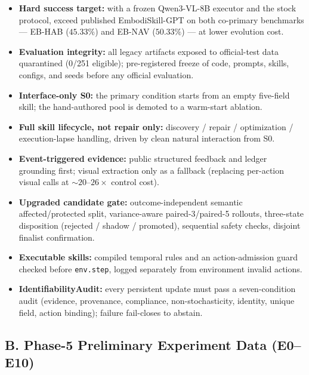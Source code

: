 \begin{itemize}\itemsep2pt
    \item \textbf{Hard success target:} with a frozen Qwen3-VL-8B executor and the stock protocol, exceed published EmbodiSkill-GPT on both co-primary benchmarks --- EB-HAB ($45.33\%$) and EB-NAV ($50.33\%$) --- at lower evolution cost.
    \item \textbf{Evaluation integrity:} all legacy artifacts exposed to official-test data quarantined (0/251 eligible); pre-registered freeze of code, prompts, skills, configs, and seeds before any official evaluation.
    \item \textbf{Interface-only S0:} the primary condition starts from an empty five-field skill; the hand-authored pool is demoted to a warm-start ablation.
    \item \textbf{Full skill lifecycle, not repair only:} discovery / repair / optimization / execution-lapse handling, driven by clean natural interaction from S0.
    \item \textbf{Event-triggered evidence:} public structured feedback and ledger grounding first; visual extraction only as a fallback (replacing per-action visual calls at ${\sim}20$--$26\times$ control cost).
    \item \textbf{Upgraded candidate gate:} outcome-independent semantic affected/protected split, variance-aware paired-3/paired-5 rollouts, three-state disposition (rejected / shadow / promoted), sequential safety checks, disjoint finalist confirmation.
    \item \textbf{Executable skills:} compiled temporal rules and an action-admission guard checked before \texttt{env.step}, logged separately from environment invalid actions.
    \item \textbf{IdentifiabilityAudit:} every persistent update must pass a seven-condition audit (evidence, provenance, compliance, non-stochasticity, identity, unique field, action binding); failure fail-closes to abstain.
\end{itemize}

\vspace{0.6em}

\subsection*{B. Phase-5 Preliminary Experiment Data (E0--E10)}


